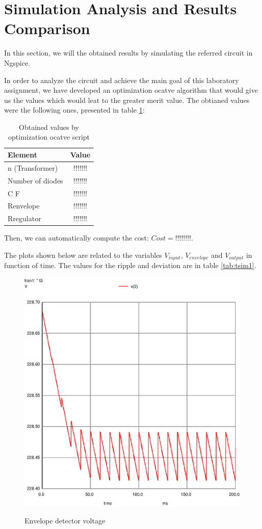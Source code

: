 \newpage
\section{Simulation Analysis and Results Comparison}
\label{sec:simulation}

In this section, we will the obtained results by simulating the referred circuit in Ngspice. 

In order to analyze the circuit and achieve the main goal of this laboratory assignment, we have developed an optimization ocatve algorithm that would give us the values which would leat to the greater merit value. The obtianed values were the following ones, presented in table \ref{tab:vsim1}:

\begin{table}[h]
    \centering
    \begin{tabular}{|l|c|}
    \hline
    {\bf Element } & {\bf Value} \\
    \hline \hline
    n (Transformer) & !!!!!!! \\
    \hline
    Number of diodes & !!!!!!! \\
    \hline
    C F & !!!!!!! \\
    \hline
    Renvelope & !!!!!!! \\
    \hline
    Rregulator  & !!!!!!! \\
    \hline
    \end{tabular}
    \caption{Obtained values by optimization ocatve script}
    \label{tab:vsim1}
\end{table}

Then, we can automatically compute the cost: $Cost = !!!!!!!!$.

The plots shown below are related to the variables $V_{input}$, $V_{envelope}$ and $V_{output}$ in function of time. The values for the ripple and deviation are in table \ref{tab:tsim1}.

\begin{figure}[!ht] \centering
\caption{Envelope detector voltage}
\includegraphics[width=0.6\linewidth]{venv.ps}
\label{fig:gteo1}
\end{figure}
\newpage

